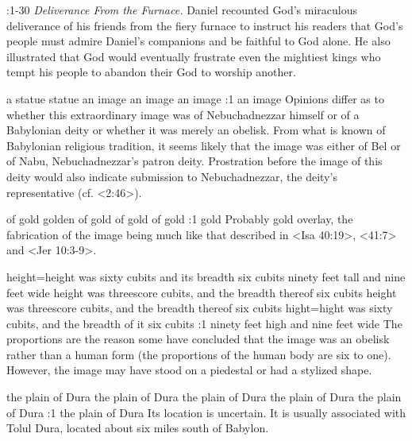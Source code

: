 :1-30 {} {\it Deliverance From the Furnace.\/} Daniel recounted God's 
miraculous deliverance of his friends from the fiery furnace to instruct his readers that God's
people must admire Daniel's companions and be faithful to God alone. He also illustrated that God 
would eventually frustrate even the mightiest kings who tempt his 
people to abandon their God to worship another.

    {a statue} %
    {statue} %
    {an image} %
    {an image} %
    {an image} %
:1 {an image} Opinions differ as to whether this extraordinary 
image was of Nebuchadnezzar himself or of a Babylonian deity or 
whether it was merely an obelisk. From what is known of Babylonian religious tradition, it seems
likely that the image was either of  
Bel or of Nabu, Nebuchadnezzar's patron deity. Prostration before 
the image of this deity would also indicate submission to Nebuchadnezzar, the deity's representative
(cf. <2:46>).

    {of gold} %
    {golden} %
    {of gold} %
    {of gold} %
    {of gold} %
:1 {gold} Probably  
gold overlay, the fabrication of the image being much like that described in <Isa 40:19>, <41:7> and
<Jer 10:3-9>.


    {height}={height was sixty cubits and its breadth six cubits} %
    {ninety feet tall and nine feet wide} %
    {height was threescore cubits, and the breadth thereof six cubits} %
    {height was threescore cubits, and the breadth thereof six cubits} %
    {hight}={hight was sixty cubits, and the breadth of it six cubits} %
:1 {ninety feet high and nine feet wide} The proportions are the reason some have 
concluded that the image was an obelisk rather than a human form 
(the proportions of the human body are six to one). However, the 
image may have stood on a piedestal or had a stylized shape. 


    {the plain of Dura} %
    {the plain of Dura} %
    {the plain of Dura} %
    {the plain of Dura} %
    {the plain of Dura} %
:1 {the plain of Dura} Its location is uncertain. It is usually associated with 
Tolul Dura, located about six miles south of Babylon.


